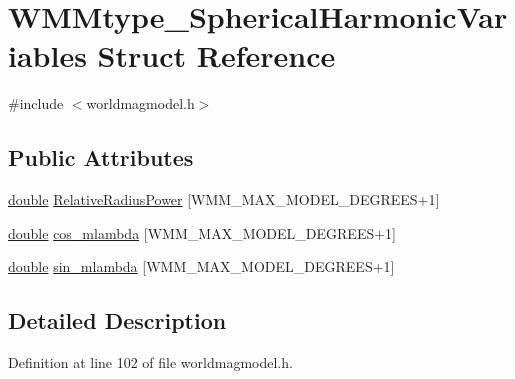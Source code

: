 \hypertarget{struct_w_m_mtype___spherical_harmonic_variables}{\section{W\-M\-Mtype\-\_\-\-Spherical\-Harmonic\-Variables Struct Reference}
\label{struct_w_m_mtype___spherical_harmonic_variables}
}


{\ttfamily \#include $<$worldmagmodel.\-h$>$}

\subsection*{Public Attributes}
\begin{DoxyCompactItemize}
\item 
\hyperlink{_super_l_u_support_8h_a8956b2b9f49bf918deed98379d159ca7}{double} \hyperlink{struct_w_m_mtype___spherical_harmonic_variables_acb306412b3b73ab19d9b2218911de891}{Relative\-Radius\-Power} \mbox{[}W\-M\-M\-\_\-\-M\-A\-X\-\_\-\-M\-O\-D\-E\-L\-\_\-\-D\-E\-G\-R\-E\-E\-S+1\mbox{]}
\item 
\hyperlink{_super_l_u_support_8h_a8956b2b9f49bf918deed98379d159ca7}{double} \hyperlink{struct_w_m_mtype___spherical_harmonic_variables_adf506376126edf63fabf8877e416d52e}{cos\-\_\-mlambda} \mbox{[}W\-M\-M\-\_\-\-M\-A\-X\-\_\-\-M\-O\-D\-E\-L\-\_\-\-D\-E\-G\-R\-E\-E\-S+1\mbox{]}
\item 
\hyperlink{_super_l_u_support_8h_a8956b2b9f49bf918deed98379d159ca7}{double} \hyperlink{struct_w_m_mtype___spherical_harmonic_variables_af6906ecd2a98bea39e7d43459d7399cb}{sin\-\_\-mlambda} \mbox{[}W\-M\-M\-\_\-\-M\-A\-X\-\_\-\-M\-O\-D\-E\-L\-\_\-\-D\-E\-G\-R\-E\-E\-S+1\mbox{]}
\end{DoxyCompactItemize}


\subsection{Detailed Description}


Definition at line 102 of file worldmagmodel.\-h.



